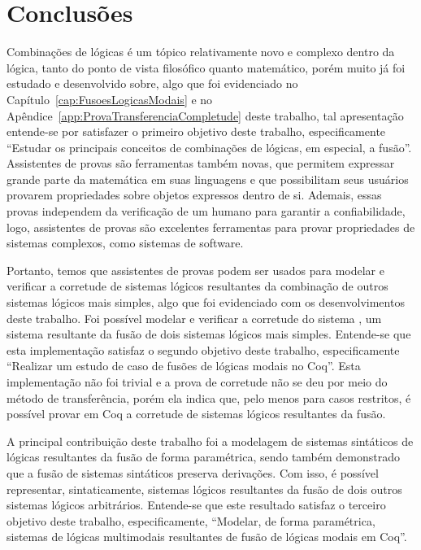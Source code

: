 \chapter{Conclusões}
	\label{cap:Conclusao}
	Combinações de lógicas é um tópico relativamente novo e complexo dentro da lógica, tanto do ponto de vista filosófico quanto matemático,
	porém muito já foi estudado e desenvolvido sobre, algo que foi evidenciado no Capítulo~\ref{cap:FusoesLogicasModais} e no
	Apêndice~\ref{app:ProvaTransferenciaCompletude} deste trabalho, tal apresentação entende-se por satisfazer o primeiro objetivo deste trabalho, especificamente
	``Estudar os principais conceitos de combinações de lógicas, em especial, a fusão''. Assistentes de provas são ferramentas também novas, que permitem expressar
	grande parte da matemática em suas linguagens e que possibilitam seus usuários provarem propriedades sobre objetos expressos dentro de si. Ademais, essas provas independem da
	verificação de um humano para garantir a confiabilidade, logo, assistentes de provas são excelentes ferramentas para provar propriedades de sistemas complexos,
	como sistemas de software.

	Portanto, temos que assistentes de provas podem ser usados para modelar e verificar a corretude de sistemas lógicos resultantes da combinação de outros sistemas lógicos
	mais simples, algo que foi evidenciado com os desenvolvimentos deste trabalho. Foi possível modelar e verificar a corretude do sistema \SisT, um sistema resultante da fusão de
	dois sistemas lógicos mais simples. Entende-se que esta implementação satisfaz o segundo objetivo deste trabalho, especificamente ``Realizar um estudo de caso de fusões de lógicas
	modais no Coq''. Esta implementação não foi trivial e a prova de corretude não se deu por meio do método de transferência, porém ela indica que, pelo menos
	para casos restritos, é possível provar em Coq a corretude de sistemas lógicos resultantes da fusão.

	A principal contribuição deste trabalho foi a modelagem de sistemas sintáticos de lógicas resultantes da fusão de forma paramétrica, sendo também demonstrado que a
	fusão de sistemas sintáticos preserva derivações. Com isso, é possível representar, sintaticamente, sistemas lógicos resultantes da fusão de dois outros sistemas lógicos arbitrários.
	Entende-se que este resultado satisfaz o terceiro objetivo deste trabalho, especificamente, ``Modelar, de forma paramétrica, sistemas de lógicas multimodais
	resultantes de fusão de lógicas modais em Coq''.

